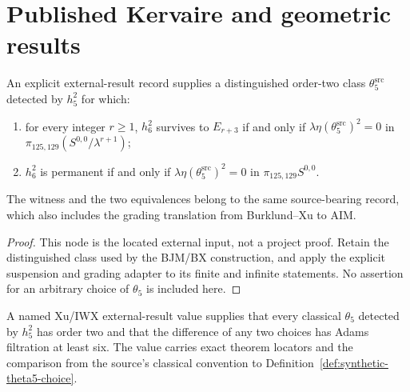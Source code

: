 \section{Published Kervaire and geometric results}

\begin{theorem}
  \label{thm:external-bjm-bx-criterion}
  \notready
  An explicit external-result record supplies a distinguished order-two class
  $\theta_5^{\mathrm{src}}$ detected by $h_5^2$ for which:
  \begin{enumerate}
    \item for every integer $r\ge1$, $h_6^2$ survives to $E_{r+3}$ if and
      only if $\lambda\eta(\theta_5^{\mathrm{src}})^2=0$ in
      $\pi_{125,129}(S^{0,0}/\lambda^{r+1})$;
    \item $h_6^2$ is permanent if and only if
      $\lambda\eta(\theta_5^{\mathrm{src}})^2=0$ in
      $\pi_{125,129}S^{0,0}$.
  \end{enumerate}
  The witness and the two equivalences belong to the same source-bearing
  record, which also includes the grading translation from Burklund--Xu to AIM.
\end{theorem}

\begin{proof}
  This node is the located external input, not a project proof.  Retain the
  distinguished class used by the BJM/BX construction, and apply the explicit
  suspension and grading adapter to its finite and infinite statements.  No
  assertion for an arbitrary choice of $\theta_5$ is included here.
\end{proof}

\begin{theorem}
  \label{thm:external-theta5-order-data}
  \notready
  A named Xu/IWX external-result value supplies that every classical
  $\theta_5$ detected by $h_5^2$ has order two and that the difference of any
  two choices has Adams filtration at least six.  The value carries exact
  theorem locators and the comparison from the source's classical convention
  to Definition~\ref{def:synthetic-theta5-choice}.
\end{theorem}

